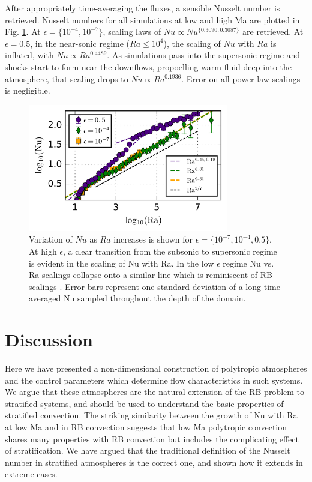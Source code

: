 \documentclass[aps, prl, twocolumn, groupedaddress, amsfonts, amssymb, amsmath]{revtex4-1}
\begin{document}
After appropriately time-averaging the fluxes, a sensible Nusselt number is retrieved.  Nusselt numbers for
all simulations at low and high Ma are plotted in Fig. \ref{fig:nu_v_ra}.  At $\epsilon = \{10^{-4}, 10^{-7}\}$,
scaling laws of $Nu \propto Nu^{\{0.3090, 0.3087\}}$ are retrieved.  At $\epsilon = 0.5$, in the near-sonic
regime ($Ra \leq 10^4$), the scaling of $Nu$ with $Ra$ is inflated, with $Nu \propto Ra^{0.4489}$.  As simulations
pass into the supersonic regime and shocks start to form near the downflows, propoelling warm fluid deep
into the atmosphere, that scaling drops to $Nu \propto Ra^{0.1936}$.  Error on all power law scalings is
negligible.

\begin{figure}[t]
\includegraphics[width=3.4375in]{./figs/nu_v_ra.png}
\caption{Variation of $Nu$ as $Ra$ increases is shown for $\epsilon = \{10^{-7}, 10^{-4}, 0.5\}$. 
At high $\epsilon$, a clear transition from the subsonic to supersonic regime is evident in the scaling
of Nu with Ra.  In the low $\epsilon$ regime Nu vs. Ra scalings collapse onto a similar line which is
reminiscent of RB scalings \cite{johnston&doering2009}.  Error bars represent one standard deviation
of a long-time averaged Nu sampled throughout the depth of the domain.
\label{fig:nu_v_ra} }
\end{figure}

\section{Discussion}
\label{sec:discussion}
Here we have presented a non-dimensional construction of polytropic atmospheres and the control parameters 
which determine flow characteristics in such systems.  We argue that these atmospheres are the natural extension
of the RB problem to stratified systems, and should be used to understand the basic properties of stratified
convection.  The striking similarity between the growth of Nu with Ra at low Ma and in RB convection suggests
that low Ma polytropic convection shares many properties with RB convection but includes the complicating
effect of stratification. We have argued that the traditional definition of the Nusselt number in stratified atmospheres
\cite{graham1975} is the correct one, and shown how it extends in extreme cases.
\end{document}
